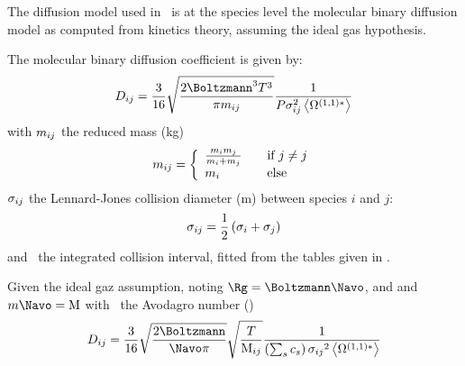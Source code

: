 The diffusion model used in \Antioch\ is at the species
level the molecular binary diffusion model as computed from kinetics
theory, assuming the ideal gas hypothesis.

The molecular binary diffusion coefficient is given by:
\begin{equation}
\diff[ij] = \frac{3}{16} \sqrt{\frac{2\Boltzmann^3\Temp^3}{\pi\Mass_{ij}}}\frac{1}{\Press\LJdia_{ij}^2\Stockmayer{1}}
\label{bimol_diff:eq}
\end{equation}
with $\Mass_{ij}$ the reduced mass (\unit{kg})
\begin{equation}
\Mass_{ij} = \left\{\begin{array}{l@{\qquad}l}
                \frac{\Mass_i\Mass_j}{\Mass_i + \Mass_j} & \text{if } j \neq j \\
                \Mass_i                                  & \text{else}
                    \end{array}
              \right.
\label{diffusion:bimol:red_mass}
\end{equation}
$\LJdia_{ij}$ the Lennard-Jones collision diameter (\unit{m})
between species $i$ and $j$:
\begin{equation}
\LJdia_{ij} = \frac{1}{2}\left(\LJdia_i + \LJdia_j\right)
\label{diffusion:bimol:LJdia}
\end{equation}
and \ the integrated collision interval, fitted from
the tables given in \citet{Monchick1961}.

Given the ideal gaz assumption, noting $\Rg = \Boltzmann\Navo$, and
and $\Mass\Navo = \Mm$ with
\Navo\ the Avodagro number (\NavoEquation)
\begin{equation}
\diff[ij] = \frac{3}{16}\sqrt{\frac{2\Boltzmann}{\Navo\pi}} 
                \sqrt{\frac{\Temp}{\Mm[ij]}}\frac{1}{\left(\sum_s\conc_s\right)\LJdia[ij]^2\Stockmayer{1}}
\label{diffusion:bimol:simplified}
\end{equation}
